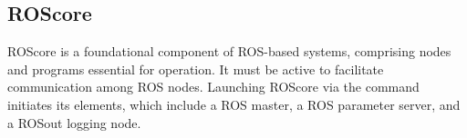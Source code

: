 \subsection{ROScore}
ROScore is a foundational component of ROS-based systems, comprising nodes and programs essential for operation. 
It must be active to facilitate communication among ROS nodes. 
Launching ROScore via the command initiates its elements, which include a ROS master, a ROS parameter server, and a ROSout logging node.